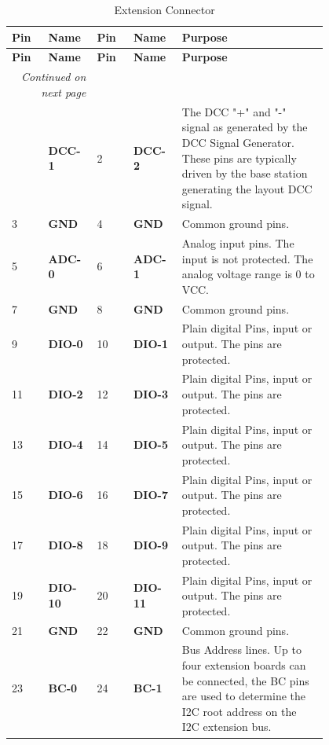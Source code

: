 \begin{longtable}{@{}|p{0.1\linewidth}|p{0.1\linewidth}|p{0.1\linewidth}|p{0.1\linewidth}|p{0.4\linewidth}|@{}}
    \caption{Extension Connector} \\
    \toprule
    \textbf{Pin} & \textbf{Name} & \textbf{Pin} & \textbf{Name} & \textbf{Purpose} \\
    \midrule
    \endfirsthead
    \toprule
    \textbf{Pin} & \textbf{Name} & \textbf{Pin} & \textbf{Name} & \textbf{Purpose} \\
    \midrule
    \endhead
    \midrule
    \multicolumn{2}{r}{\textit{Continued on next page}} \\
    \midrule
    \endfoot
    \bottomrule
    \endlastfoot
    1 & \textbf{DCC-1} & 2 & \textbf{DCC-2} & The DCC "+" and "-" signal as generated by the DCC Signal Generator. These pins are typically driven by the base station generating the layout DCC signal.\\
    \midrule
    3 & \textbf{GND} & 4 & \textbf{GND} & Common ground pins. \\
    \midrule
    5 & \textbf{ADC-0} & 6 & \textbf{ADC-1} & Analog input pins. The input is not protected. The analog voltage range is 0 to VCC. \\
    \midrule
    7 & \textbf{GND} & 8 & \textbf{GND} & Common ground pins. \\
    \midrule
    9 & \textbf{DIO-0} & 10 & \textbf{DIO-1} & Plain digital Pins, input or output. The pins are protected. \\
    \midrule
    11 & \textbf{DIO-2} & 12 & \textbf{DIO-3} & Plain digital Pins, input or output. The pins are protected. \\
    \midrule
    13 & \textbf{DIO-4} & 14 & \textbf{DIO-5} & Plain digital Pins, input or output. The pins are protected. \\
    \midrule
    15 & \textbf{DIO-6} & 16 & \textbf{DIO-7} & Plain digital Pins, input or output. The pins are protected. \\
    \midrule
    17 & \textbf{DIO-8} & 18 & \textbf{DIO-9} & Plain digital Pins, input or output. The pins are protected. \\
    \midrule
    19 & \textbf{DIO-10} & 20 & \textbf{DIO-11} & Plain digital Pins, input or output. The pins are protected. \\
    \midrule
    21 & \textbf{GND} & 22 & \textbf{GND} & Common ground pins. \\
    \midrule
    23 & \textbf{BC-0} & 24 & \textbf{BC-1} & Bus Address lines. Up to four extension boards can be connected, the BC pins are used to determine the I2C root address on the I2C extension bus. \\ 

\end{longtable}
